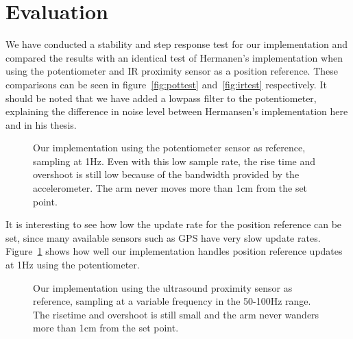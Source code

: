 \begin{figure*}
	\centering
	\subfloat[][]{\setlength\figureheight{4cm}
		\setlength\figurewidth{6cm}
		
	}
	\subfloat[][]{\setlength\figureheight{4cm}
		\setlength\figurewidth{6cm}
		
	}
	\caption{(a): Our implementation using the IR proximity sensor as reference, sampling at \(\sim\)20Hz versus (b): 
	Hermansen's implementation using the IR proximity sensor as reference, sampling at 200Hz. For (a) the slow variations in 
altitude are a result of the measurements from the IR proximity sensor being quantized in 2cm steps giving the arm
free reign to drift within that range. The noise in (b) is not measurement noise, but rapid oscillation.}
\label{fig:irtest}
\vspace{3pt}
\hrulefill
\end{figure*}
\section{Evaluation}\label{sec:evaluation}
We have conducted a stability and step response test for our implementation and compared the results with an identical test of
Hermanen's implementation when using the potentiometer and IR proximity sensor as a position reference. These comparisons can be
seen in figure~\ref{fig:pottest} and~\ref{fig:irtest} respectively. It should be noted that we have added a lowpass filter to the
potentiometer, explaining the difference in noise level between Hermansen's implementation here and in his thesis.
\begin{figure}
	\setlength\figureheight{4cm}
	\setlength\figurewidth{6cm}
	
	\caption{Our implementation using the potentiometer sensor as reference, sampling at 1Hz. Even with this low sample rate, the
		rise time and overshoot is still low because of the bandwidth provided by the accelerometer. The arm never moves more than
		1cm from the set point.}
\label{fig:pot1hztest}
\end{figure}
It is interesting to see how low the update rate for the position reference can be set, since many available sensors such as GPS 
have very slow update rates. Figure~\ref{fig:pot1hztest} shows how well our implementation handles position reference updates at
1Hz using the potentiometer.
\begin{figure}
	\setlength\figureheight{4cm}
	\setlength\figurewidth{6cm}
	
	\caption{Our implementation using the ultrasound proximity sensor as reference, sampling at a variable frequency in the 50-100Hz 
	range. The risetime and overshoot is still small and the arm never wanders more than 1cm from the set point.}
\label{fig:ultratest}
\end{figure}

